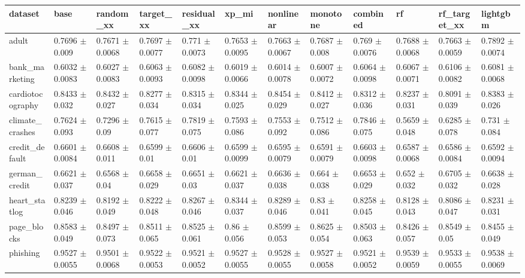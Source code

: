 \begin{tabular}{llllllllllll}
\toprule
dataset & base & random\_xx & target\_xx & residual\_xx & xp\_mi & nonlinear & monotone & combined & rf & rf\_target\_xx & lightgbm \\
\midrule
adult & 0.7696 $\pm$ 0.009 & 0.7671 $\pm$ 0.0068 & 0.7697 $\pm$ 0.0077 & 0.771 $\pm$ 0.0073 & 0.7653 $\pm$ 0.0095 & 0.7663 $\pm$ 0.0067 & 0.7687 $\pm$ 0.008 & 0.769 $\pm$ 0.0076 & 0.7688 $\pm$ 0.0068 & 0.7663 $\pm$ 0.0059 & 0.7892 $\pm$ 0.0074 \\
bank\_marketing & 0.6032 $\pm$ 0.0083 & 0.6027 $\pm$ 0.0083 & 0.6063 $\pm$ 0.0093 & 0.6082 $\pm$ 0.0098 & 0.6019 $\pm$ 0.0066 & 0.6014 $\pm$ 0.0078 & 0.6007 $\pm$ 0.0072 & 0.6064 $\pm$ 0.0098 & 0.6067 $\pm$ 0.0071 & 0.6106 $\pm$ 0.0082 & 0.6081 $\pm$ 0.0068 \\
cardiotocography & 0.8433 $\pm$ 0.032 & 0.8432 $\pm$ 0.027 & 0.8277 $\pm$ 0.034 & 0.8315 $\pm$ 0.034 & 0.8344 $\pm$ 0.025 & 0.8454 $\pm$ 0.029 & 0.8412 $\pm$ 0.027 & 0.8312 $\pm$ 0.036 & 0.8237 $\pm$ 0.031 & 0.8091 $\pm$ 0.039 & 0.8383 $\pm$ 0.026 \\
climate\_crashes & 0.7624 $\pm$ 0.093 & 0.7296 $\pm$ 0.09 & 0.7615 $\pm$ 0.077 & 0.7819 $\pm$ 0.075 & 0.7593 $\pm$ 0.086 & 0.7553 $\pm$ 0.092 & 0.7512 $\pm$ 0.086 & 0.7846 $\pm$ 0.075 & 0.5659 $\pm$ 0.048 & 0.6285 $\pm$ 0.078 & 0.731 $\pm$ 0.084 \\
credit\_default & 0.6601 $\pm$ 0.0084 & 0.6608 $\pm$ 0.011 & 0.6599 $\pm$ 0.01 & 0.6606 $\pm$ 0.01 & 0.6599 $\pm$ 0.0099 & 0.6595 $\pm$ 0.0079 & 0.6591 $\pm$ 0.0079 & 0.6603 $\pm$ 0.0098 & 0.6587 $\pm$ 0.0068 & 0.6586 $\pm$ 0.0084 & 0.6592 $\pm$ 0.0094 \\
german\_credit & 0.6621 $\pm$ 0.037 & 0.6568 $\pm$ 0.04 & 0.6658 $\pm$ 0.029 & 0.6651 $\pm$ 0.03 & 0.6621 $\pm$ 0.037 & 0.6636 $\pm$ 0.038 & 0.664 $\pm$ 0.038 & 0.6653 $\pm$ 0.029 & 0.652 $\pm$ 0.032 & 0.6705 $\pm$ 0.032 & 0.6638 $\pm$ 0.028 \\
heart\_statlog & 0.8239 $\pm$ 0.046 & 0.8192 $\pm$ 0.049 & 0.8222 $\pm$ 0.048 & 0.8267 $\pm$ 0.046 & 0.8344 $\pm$ 0.037 & 0.8289 $\pm$ 0.046 & 0.83 $\pm$ 0.041 & 0.8258 $\pm$ 0.045 & 0.8128 $\pm$ 0.043 & 0.8086 $\pm$ 0.047 & 0.8231 $\pm$ 0.031 \\
page\_blocks & 0.8583 $\pm$ 0.049 & 0.8497 $\pm$ 0.073 & 0.8511 $\pm$ 0.065 & 0.8525 $\pm$ 0.061 & 0.86 $\pm$ 0.056 & 0.8599 $\pm$ 0.053 & 0.8625 $\pm$ 0.054 & 0.8503 $\pm$ 0.063 & 0.8426 $\pm$ 0.057 & 0.8549 $\pm$ 0.05 & 0.8455 $\pm$ 0.049 \\
phishing & 0.9527 $\pm$ 0.0055 & 0.9501 $\pm$ 0.0068 & 0.9522 $\pm$ 0.0053 & 0.9521 $\pm$ 0.0052 & 0.9527 $\pm$ 0.0055 & 0.9528 $\pm$ 0.0055 & 0.9527 $\pm$ 0.0058 & 0.9521 $\pm$ 0.0052 & 0.9539 $\pm$ 0.0059 & 0.9533 $\pm$ 0.0055 & 0.9538 $\pm$ 0.0069 \\

\end{tabular}
